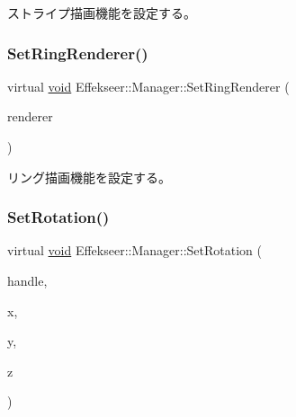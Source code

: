 ストライプ描画機能を設定する。 

\mbox{\label{class_effekseer_1_1_manager_afe6f77af79fd2bea3a36eed5b5dea383}} 
\subsubsection{\texorpdfstring{Set\+Ring\+Renderer()}{SetRingRenderer()}}
{\footnotesize\ttfamily virtual \mbox{\hyperlink{namespace_effekseer_ab34c4088e512200cf4c2716f168deb56}{void}} Effekseer\+::\+Manager\+::\+Set\+Ring\+Renderer (\begin{DoxyParamCaption}\item[{\mbox{\hyperlink{class_effekseer_1_1_ring_renderer}{Ring\+Renderer}} $\ast$}]{renderer }\end{DoxyParamCaption})\hspace{0.3cm}{\ttfamily [pure virtual]}}



リング描画機能を設定する。 

\mbox{\label{class_effekseer_1_1_manager_aab0df458615143d664e8f84d176a5be6}} 
\subsubsection{\texorpdfstring{Set\+Rotation()}{SetRotation()}\hspace{0.1cm}{\footnotesize\ttfamily [1/2]}}
{\footnotesize\ttfamily virtual \mbox{\hyperlink{namespace_effekseer_ab34c4088e512200cf4c2716f168deb56}{void}} Effekseer\+::\+Manager\+::\+Set\+Rotation (\begin{DoxyParamCaption}\item[{\mbox{\hyperlink{namespace_effekseer_afba58b8d812da862190e9bbfc040824a}{Handle}}}]{handle,  }\item[{float}]{x,  }\item[{float}]{y,  }\item[{float}]{z }\end{DoxyParamCaption})\hspace{0.3cm}{\ttfamily [pure virtual]}}



